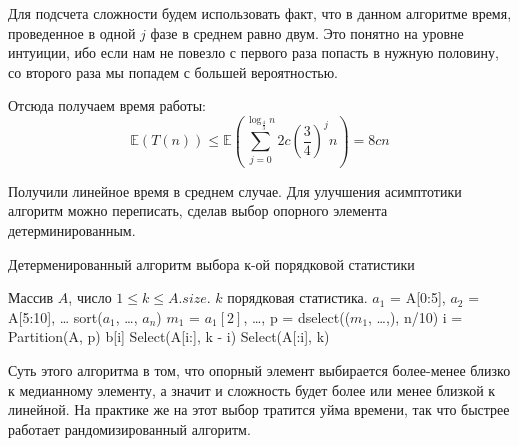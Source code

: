 \documentclass[../book.tex]{subfiles}
\begin{document}
		Для подсчета сложности будем использовать факт, что в данном алгоритме время, проведенное в одной $j$ фазе в среднем равно двум. Это понятно на уровне интуиции, ибо если нам не повезло с первого раза попасть в нужную половину, со второго раза мы попадем с большей вероятностью.
		
		Отсюда получаем время работы:
		\[\mathbb{E}(T(n)) 
		\leqslant
		\mathbb{E}
		\left(
		\sum_{j = 0}^{\log_\frac{4}{3}n} 2c
		\left(
		{\frac{3}{4}}
		\right)^j n
		\right) =
		8cn
		\]
		
		Получили линейное время в среднем случае. Для улучшения асимптотики алгоритм можно переписать, сделав выбор опорного элемента детерминированным.
		
		\begin{algorithm}[H]
			\caption{Детерменированный алгоритм выбора к-ой порядковой статистики}
			\begin{algorithmic}[1]
				\Require Массив $A$, число $1 \leqslant k \leqslant A.size$.
				\Ensure $k$ порядковая статистика.
					\State $a_1$ = A[0:5], $a_2$ = A[5:10], \ldots
					\State sort($a_1$, \ldots, $a_n$)
					\State $m_1$ = $a_1[2]$, \ldots,
					\State p = dselect(($m_1$, \ldots,), n/10)
					\State i = Partition(A, p)
						\State \Return b[i]
						\State \Return Select(A[i:], k - i)
					\Else
						\State \Return Select(A[:i], k)
					\EndIf
				\EndFunction
			\end{algorithmic}	
		\end{algorithm}
		
		Суть этого алгоритма в том, что опорный элемент выбирается более-менее близко к медианному элементу, а значит и сложность будет более или менее близкой к линейной. На практике же на этот выбор тратится уйма времени, так что быстрее работает рандомизированный алгоритм.
		
		\begin{comment}
		
		пусть $y$ содержит 10 десятичных цифр
		
		$x^y < \le (10^n)^(10^n)$
		тогда числ цифр оценивается как $n\cdot10^n$, то есть полиномиального алгоритма
		не существует
		алгоритм экспоненциальный
		
		
		
		вычислить $x^{2^k}$ для всех $2^k$:
		$x^{999} = x\cdot x^{2}\cdot x^{4}\cdot x^{32}\cdot x^{64}\cdot\ldos\cdot x^{512}$
		

		
		$T(n) \leq T(\frac{n}{5}) + T(\frac{7n}{10} + cn$
		Покажем, что $T(n) \leq \frac{dn}{5} + \frac{7dn}{10}+cn \leq dn$ при $с
		\geq 10n$
		
		\end{comment}
	\pagebreak
\end{document}
